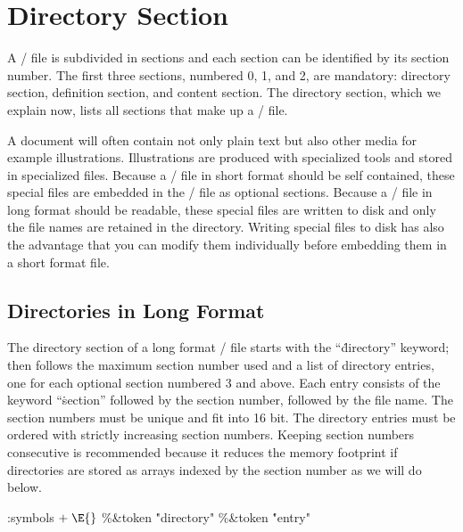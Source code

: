 


\section{Directory Section}
A \HINT/ file is subdivided in sections and
each section can be identified by its section number.
The first three sections, numbered 0, 1, and 2, are mandatory:
directory section, definition section,  and content section.
The directory section, which we explain now, lists all sections
that make up a \HINT/ file.

A document will often contain not only plain text but also other media
for example illustrations. Illustrations are produced with specialized
tools and stored in specialized files. Because a \HINT/ file in short format
should be self contained, these special files are embedded in the \HINT/ file
as optional sections.
Because a \HINT/ file in long format should be readable, these special files
are written to disk and only the file names are retained in the directory.
Writing special files to disk has also the advantage that you can modify
them individually before embedding them in a short format file.


\subsection{Directories in Long Format}\gdef\subcodetitle{Directory Section}%
The directory section of a long format \HINT/ file starts
with the  ``\.{directory}'' keyword; then follows the maximum section number used and
a list of directory entries, one for each optional section numbered 3 and above.
Each entry consists of the keyword ``\.{section}'' followed by the
section number, followed by the file name.
The section numbers must be unique and fit into 16 bit.
The directory entries must be ordered with strictly increasing section numbers.
Keeping section numbers consecutive is recommended because it reduces the
memory footprint if directories are stored as arrays indexed by the section
number as we will do below.

\readcode
\Y\par
\par
\par
\par
\par
\Y\B\4:symbols\X${}\mathrel+\E{}$\6
\8\%\&{token} \5\.{"directory"}\6
\8\%\&{token} \5\.{"entry"}
\Y
\fi


